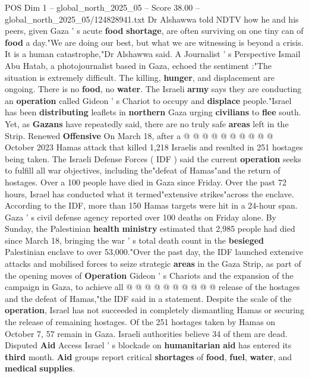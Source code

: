 \begin{textsample}{POS Dim 1 – global\_north\_2025\_05 – Score 38.00 – global\_north\_2025\_05/124828941.txt}
Dr Alshawwa told NDTV how he and his peers, given Gaza ' s acute \textbf{food} \textbf{shortage}, are often surviving on one tiny can of \textbf{food} a day."We are doing our best, but what we are witnessing is beyond a crisis.
It is a human catastrophe,"Dr Alshawwa said.
A Journalist ' s Perspective Ismail Abu Hatab, a photojournalist based in Gaza, echoed the sentiment :"The situation is extremely difficult.
The killing, \textbf{hunger}, and displacement are ongoing.
There is no \textbf{food}, no \textbf{water}.
The Israeli \textbf{army} says they are conducting an \textbf{operation} called Gideon ' s Chariot to occupy and \textbf{displace} people."Israel has been \textbf{distributing} leaflets in \textbf{northern} Gaza urging \textbf{civilians} to \textbf{flee} south.
Yet, as \textbf{Gazans} have repeatedly said, there are no truly safe \textbf{areas} left in the Strip.
Renewed \textbf{Offensive} On March 18, after a @ @ @ @ @ @ @ @ @ @ October 2023 Hamas attack that killed 1,218 Israelis and resulted in 251 hostages being taken.
The Israeli Defense Forces ( IDF ) said the current \textbf{operation} seeks to fulfill all war objectives, including the"defeat of Hamas"and the return of hostages.
Over a 100 people have died in Gaza since Friday.
Over the past 72 hours, Israel has conducted what it termed"extensive strikes"across the enclave.
According to the IDF, more than 150 Hamas targets were hit in a 24-hour span.
Gaza ' s civil defense agency reported over 100 deaths on Friday alone.
By Sunday, the Palestinian \textbf{health} \textbf{ministry} estimated that 2,985 people had died since March 18, bringing the war ' s total death count in the \textbf{besieged} Palestinian enclave to over 53,000."Over the past day, the IDF launched extensive attacks and mobilised forces to seize strategic \textbf{areas} in the Gaza Strip, as part of the opening moves of \textbf{Operation} Gideon ' s Chariots and the expansion of the campaign in Gaza, to achieve all @ @ @ @ @ @ @ @ @ @ release of the hostages and the defeat of Hamas,"the IDF said in a statement.
Despite the scale of the \textbf{operation}, Israel has not succeeded in completely dismantling Hamas or securing the release of remaining hostages.
Of the 251 hostages taken by Hamas on October 7, 57 remain in Gaza.
Israeli authorities believe 34 of them are dead.
Disputed \textbf{Aid} Access Israel ' s blockade on \textbf{humanitarian} \textbf{aid} has entered its \textbf{third} month. \textbf{Aid} groups report critical \textbf{shortages} of \textbf{food}, \textbf{fuel}, \textbf{water}, and \textbf{medical} \textbf{supplies}.

\end{textsample}
